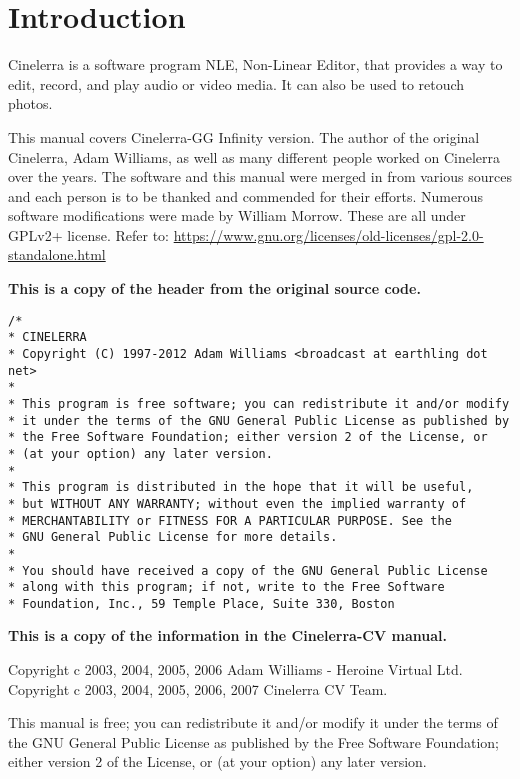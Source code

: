 \chapter*{Introduction}%
\label{cha:introduction}

Cinelerra is a software program NLE, Non-Linear Editor, that provides a way to edit, record, and play audio or video media. 
It can also be used to retouch photos.

This manual covers Cinelerra-GG Infinity version. 
The author of the original Cinelerra, Adam Williams, as well as many different people worked on Cinelerra over the years. 
The software and this manual were merged in from various sources and each person is to be thanked and commended for their efforts. 
Numerous software modifications were made by William Morrow. 
These are all under GPLv2+ license. 
Refer to: {\small\url{https://www.gnu.org/licenses/old-licenses/gpl-2.0-standalone.html}}


\textbf{This is a copy of the header from the original source code.}
\begin{lstlisting}[numbers=none,basicstyle=\footnotesize]
/*
* CINELERRA
* Copyright (C) 1997-2012 Adam Williams <broadcast at earthling dot net>
*
* This program is free software; you can redistribute it and/or modify
* it under the terms of the GNU General Public License as published by
* the Free Software Foundation; either version 2 of the License, or
* (at your option) any later version.
*
* This program is distributed in the hope that it will be useful,
* but WITHOUT ANY WARRANTY; without even the implied warranty of
* MERCHANTABILITY or FITNESS FOR A PARTICULAR PURPOSE. See the
* GNU General Public License for more details.
*
* You should have received a copy of the GNU General Public License
* along with this program; if not, write to the Free Software
* Foundation, Inc., 59 Temple Place, Suite 330, Boston
\end{lstlisting}

\textbf{This is a copy of the information in the Cinelerra-CV manual.}

Copyright c 2003, 2004, 2005, 2006 Adam Williams - Heroine Virtual Ltd.
Copyright c 2003, 2004, 2005, 2006, 2007 Cinelerra CV Team.

This manual is free; you can redistribute it and/or modify it under the terms of the GNU General
Public License as published by the Free Software Foundation; either version 2 of the License, or
(at your option) any later version.

